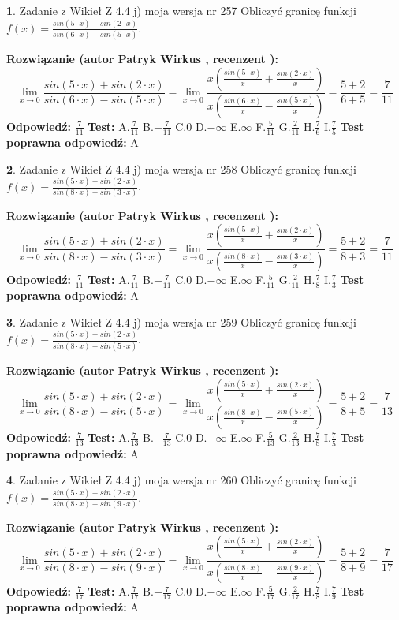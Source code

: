 \documentclass[12pt, a4paper]{article}
\theoremstyle{definition} %
\newtheorem{zad}{}
\newcommand{\zadStart}[1]{\begin{zad}#1\newline}
\newcommand{\zadStop}{\end{zad}}
\newcommand{\rozwStart}[2]{\noindent \textbf{Rozwiązanie (autor #1 , recenzent #2): }\newline}
\newcommand{\rozwStop}{\newline}
\newcommand{\odpStart}{\noindent \textbf{Odpowiedź:}\newline}
\newcommand{\odpStop}{\newline}
\newcommand{\testStart}{\noindent \textbf{Test:}\newline}
\newcommand{\testStop}{\newline}
\newcommand{\kluczStart}{\noindent \textbf{Test poprawna odpowiedź:}\newline}
\newcommand{\kluczStop}{\newline}
\begin{document}
\zadStart{Zadanie z Wikieł Z 4.4 j) moja wersja nr 257}
Obliczyć granicę funkcji $f(x)=\frac{sin(5\cdot x) +sin(2\cdot x)}{sin(6\cdot x) -sin(5\cdot x)}$.
\zadStop
\rozwStart{Patryk Wirkus}{}
$$\lim\limits_{x\to 0}\frac{sin(5\cdot x) +sin(2\cdot x)}{sin(6\cdot x) -sin(5\cdot x)}=\lim\limits_{x\to 0}\frac{x(\frac{sin(5\cdot x)}{x}+\frac{sin(2\cdot x)}{x})}{x(\frac{sin(6\cdot x)}{x}-\frac{sin(5\cdot x)}{x})}=\frac{5+2}{6+5} = \frac{7}{11}$$
\rozwStop
\odpStart
$\frac{7}{11}$
\odpStop
\testStart
A.$\frac{7}{11}$
B.$-\frac{7}{11}$
C.$0$
D.$-\infty$
E.$\infty$
F.$\frac{5}{11}$
G.$\frac{2}{11}$
H.$\frac{7}{6}$
I.$\frac{7}{5}$
\testStop
\kluczStart
A
\kluczStop



\zadStart{Zadanie z Wikieł Z 4.4 j) moja wersja nr 258}
Obliczyć granicę funkcji $f(x)=\frac{sin(5\cdot x) +sin(2\cdot x)}{sin(8\cdot x) -sin(3\cdot x)}$.
\zadStop
\rozwStart{Patryk Wirkus}{}
$$\lim\limits_{x\to 0}\frac{sin(5\cdot x) +sin(2\cdot x)}{sin(8\cdot x) -sin(3\cdot x)}=\lim\limits_{x\to 0}\frac{x(\frac{sin(5\cdot x)}{x}+\frac{sin(2\cdot x)}{x})}{x(\frac{sin(8\cdot x)}{x}-\frac{sin(3\cdot x)}{x})}=\frac{5+2}{8+3} = \frac{7}{11}$$
\rozwStop
\odpStart
$\frac{7}{11}$
\odpStop
\testStart
A.$\frac{7}{11}$
B.$-\frac{7}{11}$
C.$0$
D.$-\infty$
E.$\infty$
F.$\frac{5}{11}$
G.$\frac{2}{11}$
H.$\frac{7}{8}$
I.$\frac{7}{3}$
\testStop
\kluczStart
A
\kluczStop



\zadStart{Zadanie z Wikieł Z 4.4 j) moja wersja nr 259}
Obliczyć granicę funkcji $f(x)=\frac{sin(5\cdot x) +sin(2\cdot x)}{sin(8\cdot x) -sin(5\cdot x)}$.
\zadStop
\rozwStart{Patryk Wirkus}{}
$$\lim\limits_{x\to 0}\frac{sin(5\cdot x) +sin(2\cdot x)}{sin(8\cdot x) -sin(5\cdot x)}=\lim\limits_{x\to 0}\frac{x(\frac{sin(5\cdot x)}{x}+\frac{sin(2\cdot x)}{x})}{x(\frac{sin(8\cdot x)}{x}-\frac{sin(5\cdot x)}{x})}=\frac{5+2}{8+5} = \frac{7}{13}$$
\rozwStop
\odpStart
$\frac{7}{13}$
\odpStop
\testStart
A.$\frac{7}{13}$
B.$-\frac{7}{13}$
C.$0$
D.$-\infty$
E.$\infty$
F.$\frac{5}{13}$
G.$\frac{2}{13}$
H.$\frac{7}{8}$
I.$\frac{7}{5}$
\testStop
\kluczStart
A
\kluczStop



\zadStart{Zadanie z Wikieł Z 4.4 j) moja wersja nr 260}
Obliczyć granicę funkcji $f(x)=\frac{sin(5\cdot x) +sin(2\cdot x)}{sin(8\cdot x) -sin(9\cdot x)}$.
\zadStop
\rozwStart{Patryk Wirkus}{}
$$\lim\limits_{x\to 0}\frac{sin(5\cdot x) +sin(2\cdot x)}{sin(8\cdot x) -sin(9\cdot x)}=\lim\limits_{x\to 0}\frac{x(\frac{sin(5\cdot x)}{x}+\frac{sin(2\cdot x)}{x})}{x(\frac{sin(8\cdot x)}{x}-\frac{sin(9\cdot x)}{x})}=\frac{5+2}{8+9} = \frac{7}{17}$$
\rozwStop
\odpStart
$\frac{7}{17}$
\odpStop
\testStart
A.$\frac{7}{17}$
B.$-\frac{7}{17}$
C.$0$
D.$-\infty$
E.$\infty$
F.$\frac{5}{17}$
G.$\frac{2}{17}$
H.$\frac{7}{8}$
I.$\frac{7}{9}$
\testStop
\kluczStart
A
\kluczStop
\end{document}
